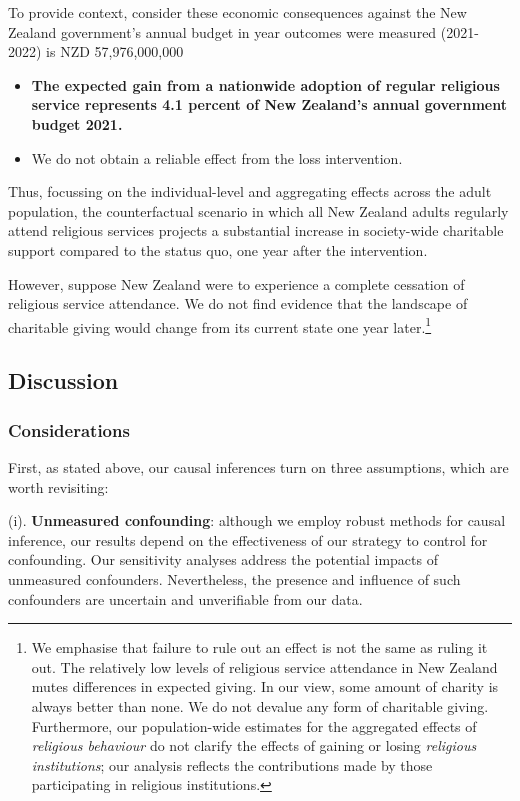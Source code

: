 \documentclass[
  single column]{article}
\providecommand{\tightlist}{%
  \setlength{\itemsep}{0pt}\setlength{\parskip}{0pt}}\usepackage{longtable,booktabs,array}
\begin{document}
To provide context, consider these economic consequences against the New
Zealand government's annual budget in year outcomes were measured
(2021-2022) is NZD 57,976,000,000

\begin{itemize}
\tightlist
\item
  \textbf{The expected gain from a nationwide adoption of regular
  religious service represents 4.1 percent of New Zealand's annual
  government budget 2021.}
\item
  We do not obtain a reliable effect from the loss intervention.
\end{itemize}

Thus, focussing on the individual-level and aggregating effects across
the adult population, the counterfactual scenario in which all New
Zealand adults regularly attend religious services projects a
substantial increase in society-wide charitable support compared to the
status quo, one year after the intervention.

However, suppose New Zealand were to experience a complete cessation of
religious service attendance. We do not find evidence that the landscape
of charitable giving would change from its current state one year
later.\footnote{We emphasise that failure to rule out an effect is not
  the same as ruling it out. The relatively low levels of religious
  service attendance in New Zealand mutes differences in expected
  giving. In our view, some amount of charity is always better than
  none. We do not devalue any form of charitable giving. Furthermore,
  our population-wide estimates for the aggregated effects of
  \emph{religious behaviour} do not clarify the effects of gaining or
  losing \emph{religious institutions}; our analysis reflects the
  contributions made by those participating in religious institutions.}

\subsection{Discussion}\label{discussion}

\subsubsection{Considerations}\label{considerations}

First, as stated above, our causal inferences turn on three assumptions,
which are worth revisiting:

(i). \textbf{Unmeasured confounding}: although we employ robust methods
for causal inference, our results depend on the effectiveness of our
strategy to control for confounding. Our sensitivity analyses address
the potential impacts of unmeasured confounders. Nevertheless, the
presence and influence of such confounders are uncertain and
unverifiable from our data.
\end{document}
